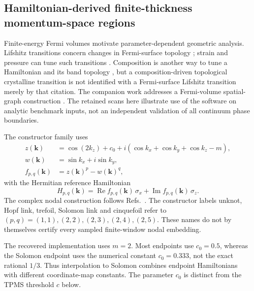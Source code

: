 \subsection{Hamiltonian-derived finite-thickness momentum-space regions}
\label{supp:hamiltonian_phase_maps}
Finite-energy Fermi volumes motivate parameter-dependent geometric analysis. Lifshitz transitions concern changes in Fermi-surface topology \cite{kg_lifshitz1960,kg_varlamov2021lifshitz}; strain and pressure can tune such transitions \cite{kg_sunko2019lifshitz,kg_xiang2015lifshitz}. Composition is another way to tune a Hamiltonian and its band topology \cite{kg_dziawa2012topological}, but a composition-driven topological crystalline transition is not identified with a Fermi-surface Lifshitz transition merely by that citation. The companion work addresses a Fermi-volume spatial-graph construction \cite{akgun_yan_2026topologicalclassificationknottedgraphs}. The retained scans here illustrate use of the software on analytic benchmark inputs, not an independent validation of all continuum phase boundaries.

The constructor family uses
\begin{equation}
\begin{aligned}
z(\mathbf k)&=\cos(2k_z)+c_0+i\!\left(\cos k_x+\cos k_y+\cos k_z-m\right),\\
w(\mathbf k)&=\sin k_x+i\sin k_y,\\
f_{p,q}(\mathbf k)&=z(\mathbf k)^p-w(\mathbf k)^q,
\end{aligned}
\label{suppeq:nodal_pq_field}
\end{equation}
with the Hermitian reference Hamiltonian
\begin{equation}
H_{p,q}(\mathbf k)=\operatorname{Re}f_{p,q}(\mathbf k)\,\sigma_x+\operatorname{Im}f_{p,q}(\mathbf k)\,\sigma_z.
\label{suppeq:nodal_pq_hamiltonian}
\end{equation}
The complex nodal construction follows Refs.~\cite{kg_bi2017nodalknot,kg_lee2020nodalknots}. The constructor labels unknot, Hopf link, trefoil, Solomon link and cinquefoil refer to $(p,q)=(1,1),(2,2),(2,3),(2,4),(2,5)$. These names do not by themselves certify every sampled finite-window nodal embedding.

The recovered implementation uses $m=2$. Most endpoints use $c_0=0.5$, whereas the Solomon endpoint uses the numerical constant $c_0=0.333$, not the exact rational $1/3$. Thus interpolation to Solomon combines endpoint Hamiltonians with different coordinate-map constants. The parameter $c_0$ is distinct from the TPMS threshold $c$ below.

